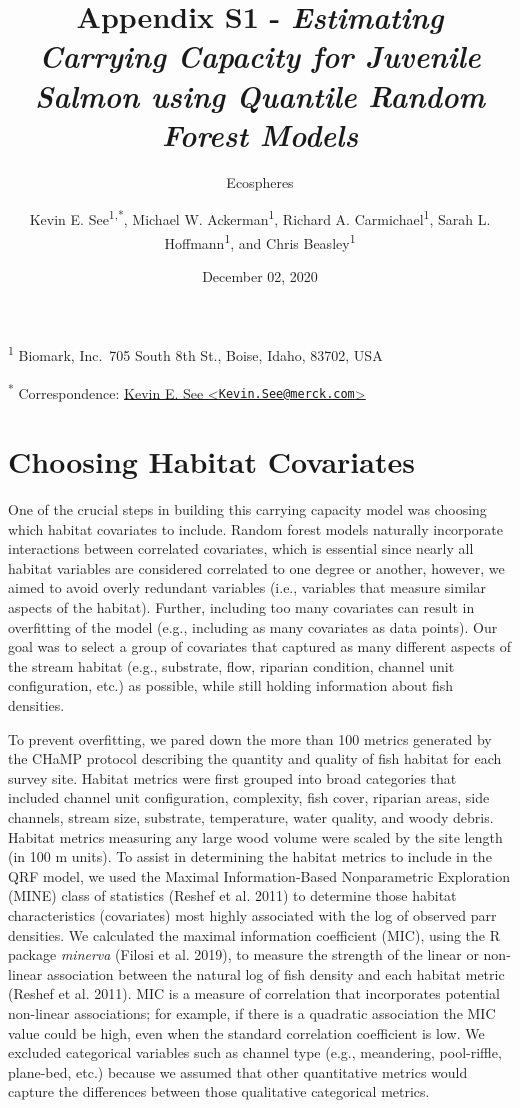 \documentclass[
  12pt,
]{article}
\title{Appendix S1 - \emph{Estimating Carrying Capacity for Juvenile Salmon using Quantile Random Forest Models}}
\subtitle{Ecospheres}
\author{Kevin E. See\textsuperscript{1,*}, Michael W. Ackerman\textsuperscript{1}, Richard A. Carmichael\textsuperscript{1}, Sarah L. Hoffmann\textsuperscript{1}, and Chris Beasley\textsuperscript{1}}
\date{December 02, 2020}
\begin{document}
\maketitle

\textsuperscript{1} Biomark, Inc.~705 South 8th St., Boise, Idaho, 83702, USA

\textsuperscript{*} Correspondence: \href{mailto:Kevin.See@merck.com}{Kevin E. See \textless{}\href{mailto:Kevin.See@merck.com}{\nolinkurl{Kevin.See@merck.com}}\textgreater{}}

\hypertarget{choosing-habitat-covariates}{%
\section{Choosing Habitat Covariates}\label{choosing-habitat-covariates}}

One of the crucial steps in building this carrying capacity model was choosing which habitat covariates to include. Random forest models naturally incorporate interactions between correlated covariates, which is essential since nearly all habitat variables are considered correlated to one degree or another, however, we aimed to avoid overly redundant variables (i.e., variables that measure similar aspects of the habitat). Further, including too many covariates can result in overfitting of the model (e.g., including as many covariates as data points). Our goal was to select a group of covariates that captured as many different aspects of the stream habitat (e.g., substrate, flow, riparian condition, channel unit configuration, etc.) as possible, while still holding information about fish densities.

To prevent overfitting, we pared down the more than 100 metrics generated by the CHaMP protocol describing the quantity and quality of fish habitat for each survey site. Habitat metrics were first grouped into broad categories that included channel unit configuration, complexity, fish cover, riparian areas, side channels, stream size, substrate, temperature, water quality, and woody debris. Habitat metrics measuring any large wood volume were scaled by the site length (in 100 m units). To assist in determining the habitat metrics to include in the QRF model, we used the Maximal Information-Based Nonparametric Exploration (MINE) class of statistics (Reshef et al. 2011) to determine those habitat characteristics (covariates) most highly associated with the log of observed parr densities. We calculated the maximal information coefficient (MIC), using the R package \emph{minerva} (Filosi et al. 2019), to measure the strength of the linear or non-linear association between the natural log of fish density and each habitat metric (Reshef et al. 2011). MIC is a measure of correlation that incorporates potential non-linear associations; for example, if there is a quadratic association the MIC value could be high, even when the standard correlation coefficient is low. We excluded categorical variables such as channel type (e.g., meandering, pool-riffle, plane-bed, etc.) because we assumed that other quantitative metrics would capture the differences between those qualitative categorical metrics.
\end{document}
